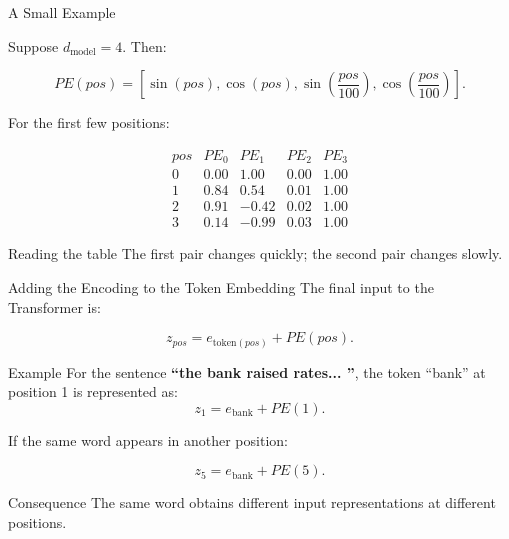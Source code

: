 \documentclass[aspectratio=169]{beamer}
\begin{document}
%
%
\begin{frame}{A Small Example}

Suppose \(d_{\text{model}}=4\). Then:

\[
PE(pos)=
\left[
\sin(pos),
\cos(pos),
\sin\left(\frac{pos}{100}\right),
\cos\left(\frac{pos}{100}\right)
\right].
\]

\medskip

For the first few positions:

\[
\begin{array}{c|cccc}
pos & PE_0 & PE_1 & PE_2 & PE_3 \\
\hline
0 & 0.00 & 1.00 & 0.00 & 1.00 \\
1 & 0.84 & 0.54 & 0.01 & 1.00 \\
2 & 0.91 & -0.42 & 0.02 & 1.00 \\
3 & 0.14 & -0.99 & 0.03 & 1.00
\end{array}
\]

\medskip

\begin{block}{Reading the table}
The first pair changes quickly; the second pair changes slowly.
\end{block}

\end{frame}
%
%
\begin{frame}{Adding the Encoding to the Token Embedding}
\small
The final input to the Transformer is:

\[
z_{pos}
=
e_{\text{token}(pos)}
+
PE(pos).
\]

\begin{exampleblock}{Example}
For the sentence \textbf{``the bank raised rates... ''}, the token ``bank'' at position 1 is represented as:
\[
z_1 = e_{\text{bank}} + PE(1).
\]
\end{exampleblock}

If the same word appears in another position:

\[
z_5 = e_{\text{bank}} + PE(5).
\]

\begin{alertblock}{Consequence}
The same word obtains different input representations at different positions.
\end{alertblock}

\end{frame}
%
%
\end{document}
